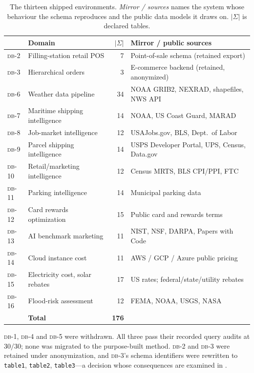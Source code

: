 \documentclass[11pt,letterpaper]{article}
\theoremstyle{definition}
\theoremstyle{plain}
\theoremstyle{remark}
\newcommand{\dbn}[1]{\textsc{db-#1}}
\newcommand{\code}[1]{\texttt{#1}}
\begin{document}
\begin{table}[t]
\centering\small
\caption{The thirteen shipped environments. \emph{Mirror / sources} names the system whose
behaviour the schema reproduces and the public data models it draws on. $|\Sigma|$ is
declared tables.}
\label{tab:corpus}
\begin{tabular}{@{}llrl@{}}
\toprule
& \textbf{Domain} & $|\Sigma|$ & \textbf{Mirror / public sources} \\
\midrule
\dbn{2}  & Filling-station retail POS      & 7  & Point-of-sale schema (retained export) \\
\dbn{3}  & Hierarchical orders             & 3  & E-commerce backend (retained, anonymized) \\
\dbn{6}  & Weather data pipeline           & 34 & NOAA GRIB2, NEXRAD, shapefiles, NWS API \\
\dbn{7}  & Maritime shipping intelligence  & 14 & NOAA, US Coast Guard, MARAD \\
\dbn{8}  & Job-market intelligence         & 12 & USAJobs.gov, BLS, Dept.\ of Labor \\
\dbn{9}  & Parcel shipping intelligence    & 14 & USPS Developer Portal, UPS, Census, Data.gov \\
\dbn{10} & Retail/marketing intelligence   & 12 & Census MRTS, BLS CPI/PPI, FTC \\
\dbn{11} & Parking intelligence            & 14 & Municipal parking data \\
\dbn{12} & Card rewards optimization       & 15 & Public card and rewards terms \\
\dbn{13} & AI benchmark marketing          & 11 & NIST, NSF, DARPA, Papers with Code \\
\dbn{14} & Cloud instance cost             & 11 & AWS / GCP / Azure public pricing \\
\dbn{15} & Electricity cost, solar rebates & 17 & US rates; federal/state/utility rebates \\
\dbn{16} & Flood-risk assessment           & 12 & FEMA, NOAA, USGS, NASA \\
\midrule
& \textbf{Total} & \textbf{176} & \\
\bottomrule
\end{tabular}
\end{table}

\dbn{1}, \dbn{4} and \dbn{5} were withdrawn. All three pass their recorded query audits at
$30/30$; none was migrated to the purpose-built method. \dbn{2} and \dbn{3} were retained
under anonymization, and \dbn{3}'s schema identifiers were rewritten to \code{table1},
\code{table2}, \code{table3}---a decision whose consequences are examined in .
\end{document}
